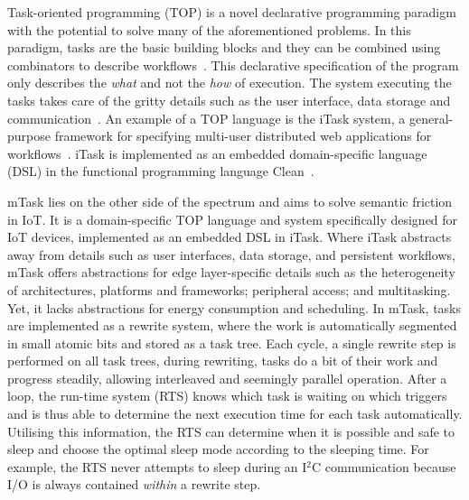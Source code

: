 \documentclass[runningheads]{llncs}
\begin{document}
Task-oriented programming (TOP) is a novel declarative programming paradigm with the potential to solve many of the aforementioned problems.
In this paradigm, tasks are the basic building blocks and they can be combined using combinators to describe workflows~\cite{plasmeijer_task-oriented_2012}.
This declarative specification of the program only describes the \emph{what} and not the \emph{how} of execution.
The system executing the tasks takes care of the gritty details such as the user interface, data storage and communication~\cite{frp_vs_top}.
An example of a TOP language is the iTask system, a general-purpose framework for specifying multi-user distributed web applications for workflows~\cite{TOP-ICFP07}.
iTask is implemented as an embedded domain-specific language (DSL) in the functional programming language Clean~\cite{brus_clean_1987,Clean:language}.

mTask lies on the other side of the spectrum and aims to solve semantic friction in IoT.
It is a domain-specific TOP language and system specifically designed for IoT devices, implemented as an embedded DSL in iTask.
Where iTask abstracts away from details such as user interfaces, data storage, and persistent workflows, mTask offers abstractions for edge layer-specific details such as the heterogeneity of architectures, platforms and frameworks; peripheral access; and multitasking.
Yet, it lacks abstractions for energy consumption and scheduling.
In mTask, tasks are implemented as a rewrite system, where the work is automatically segmented in small atomic bits and stored as a task tree.
Each cycle, a single rewrite step is performed on all task trees, during rewriting, tasks do a bit of their work and progress steadily, allowing interleaved and seemingly parallel operation.
After a loop, the run-time system (RTS) knows which task is waiting on which triggers and is thus able to determine the next execution time for each task automatically.
Utilising this information, the RTS can determine when it is possible and safe to sleep and choose the optimal sleep mode according to the sleeping time.
For example, the RTS never attempts to sleep during an I$^2$C communication because I/O is always contained \emph{within} a rewrite step.

\end{document}
